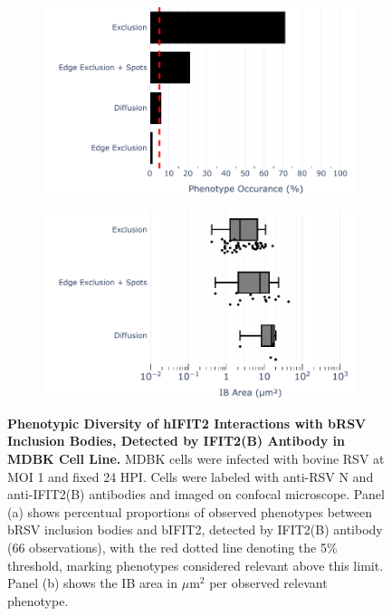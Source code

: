 \begin{figure}
    \begin{subfigure}{0.495\textwidth}
        \caption{}
        \includegraphics[width=1\linewidth]{08. Chapter 3/Figs/02. Infection/02. IFIT2/02. IFIT2B/10. bar_i2b_mdbk.pdf} 
    \end{subfigure}
    \begin{subfigure}{0.495\textwidth}
        \caption{}
        \includegraphics[width=1\linewidth]{08. Chapter 3/Figs/02. Infection/02. IFIT2/02. IFIT2B/11. box_i2b_mdbk.pdf}
    \end{subfigure}
    \caption[Phenotypic Diversity of hIFIT2 Interactions with bRSV Inclusion Bodies, Detected by IFIT2(B) Antibody in MDBK Cell Line.]{\textbf{Phenotypic Diversity of hIFIT2 Interactions with bRSV Inclusion Bodies, Detected by IFIT2(B) Antibody in MDBK Cell Line.} MDBK cells were infected with bovine RSV at MOI 1 and fixed 24 HPI. Cells were labeled with anti-RSV N and anti-IFIT2(B) antibodies and imaged on confocal microscope. Panel (a) shows percentual proportions of observed phenotypes between bRSV inclusion bodies and bIFIT2, detected by IFIT2(B) antibody (66 observations), with the red dotted line denoting the 5\% threshold, marking phenotypes considered relevant above this limit. Panel (b) shows the IB area in \(\mu \mbox{m}^2\) per observed relevant phenotype.}
    \label{fig:Phenotypic Diversity of hIFIT2 Interactions with bRSV Inclusion Bodies, Detected by IFIT2(B) Antibody in MDBK Cell Line}
\end{figure}

